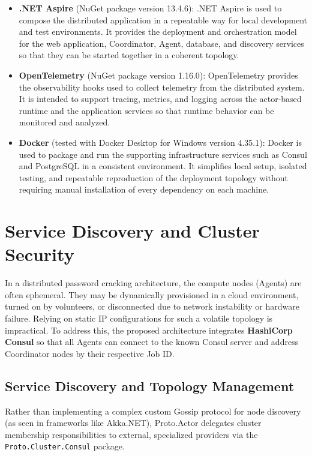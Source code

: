 \begin{itemize}
    \item \textbf{.NET Aspire} (NuGet package version 13.4.6): .NET Aspire is used to compose the distributed application in a repeatable way for local development and test environments. It provides the deployment and orchestration model for the web application, Coordinator, Agent, database, and discovery services so that they can be started together in a coherent topology.

    \item \textbf{OpenTelemetry} (NuGet package version 1.16.0): OpenTelemetry provides the observability hooks used to collect telemetry from the distributed system. It is intended to support tracing, metrics, and logging across the actor-based runtime and the application services so that runtime behavior can be monitored and analyzed.

    \item \textbf{Docker} (tested with Docker Desktop for Windows version 4.35.1): Docker is used to package and run the supporting infrastructure services such as Consul and PostgreSQL in a consistent environment. It simplifies local setup, isolated testing, and repeatable reproduction of the deployment topology without requiring manual installation of every dependency on each machine.
\end{itemize}

\section{Service Discovery and Cluster Security}

In a distributed password cracking architecture, the compute nodes (Agents) are often ephemeral. They may be dynamically provisioned in a cloud environment, turned on by volunteers, or disconnected due to network instability or hardware failure. Relying on static IP configurations for such a volatile topology is impractical. To address this, the proposed architecture integrates \textbf{HashiCorp Consul} so that all Agents can connect to the known Consul server and address Coordinator nodes by their respective Job ID.

\subsection{Service Discovery and Topology Management}

Rather than implementing a complex custom Gossip protocol for node discovery (as seen in frameworks like Akka.NET), Proto.Actor delegates cluster membership responsibilities to external, specialized providers via the \verb|Proto.Cluster.Consul| package.

